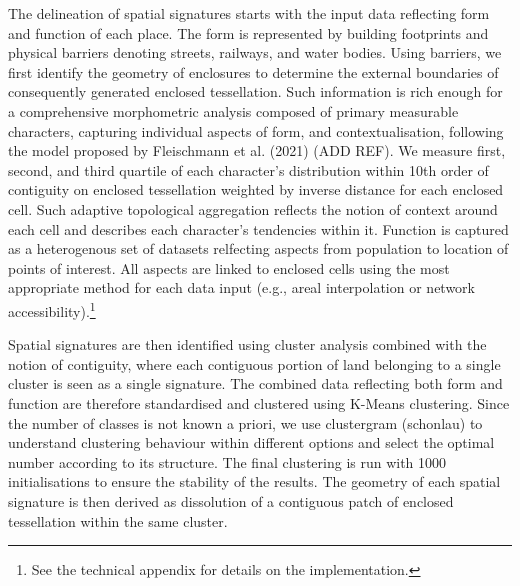 

The delineation of spatial signatures starts with the input data reflecting form
and function of each place. The form is represented by building footprints and
physical barriers denoting streets, railways, and water bodies.
Using barriers, we first identify the geometry of enclosures to determine the
external boundaries of consequently generated enclosed tessellation.
Such information is rich enough for a comprehensive morphometric analysis
composed of primary measurable characters, capturing individual aspects of form,
and contextualisation, following the model proposed by Fleischmann et al. (2021)
(ADD REF).
We measure first, second, and third quartile of each
character's distribution within 10th order of contiguity on enclosed
tessellation weighted by inverse distance for each enclosed cell. Such adaptive
topological aggregation reflects the notion of context around each cell and
describes each character's tendencies within it.
Function is captured as a heterogenous set of datasets relfecting aspects from
population to location of points of interest. All aspects are linked to enclosed
cells using the most appropriate method for each data input (e.g., areal
interpolation or network accessibility).\footnote{See the technical appendix for
details on the implementation.}


Spatial signatures are then identified using cluster analysis combined with the
notion of contiguity, where each contiguous portion of land belonging to a
single cluster is seen as a single signature.
The combined data reflecting both form and function are therefore standardised
and clustered using K-Means clustering. Since the number of classes is not known
a priori, we use clustergram (schonlau) to understand clustering behaviour
within different options and select the optimal number according to its
structure.
The final clustering is run with 1000 initialisations to ensure the stability of
the results.
The geometry of each spatial signature is then derived as dissolution of a
contiguous patch of enclosed tessellation within the same cluster.


